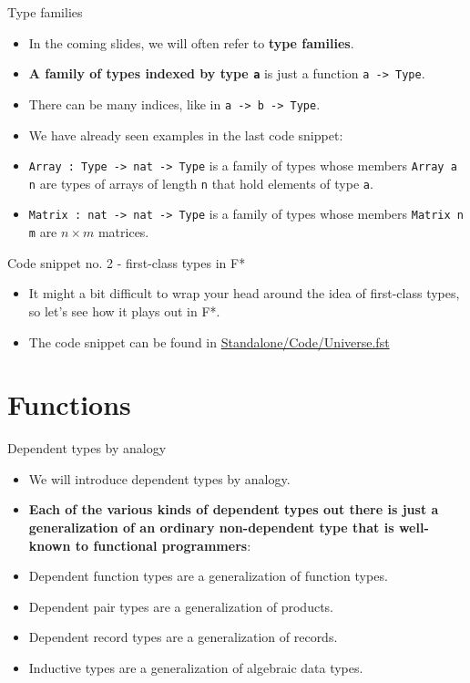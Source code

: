 \documentclass{beamer}
\newcommand{\m}[1]{\texttt{#1}}
\begin{document}
\begin{frame}{Type families}
\begin{itemize}
	\item In the coming slides, we will often refer to \textbf{type families}.
	\item \textbf{A family of types indexed by type \m{a}} is just a function \m{a -> Type}.
	\item There can be many indices, like in \m{a -> b -> Type}.
	\item We have already seen examples in the last code snippet:
	\item \m{Array :\ Type -> nat -> Type} is a family of types whose members \m{Array a n} are types of arrays of length \m{n} that hold elements of type \m{a}.
	\item \m{Matrix :\ nat -> nat -> Type} is a family of types whose members \m{Matrix n m} are $n \times m$ matrices.
\end{itemize}
\end{frame}

\begin{frame}{Code snippet no. 2 - first-class types in F*}
\begin{itemize}
	\item It might a bit difficult to wrap your head around the idea of first-class types, so let's see how it plays out in F*.
	\item The code snippet can be found in \href{https://github.com/wkolowski/Dependent-Types-and-Theorem-Proving/blob/master/Standalone/Code/Universe.fst}{Standalone/Code/Universe.fst}
\end{itemize}
\end{frame}

\section{Functions}

\begin{frame}{Dependent types by analogy}
\begin{itemize}
	\item We will introduce dependent types by analogy.
	\item \textbf{Each of the various kinds of dependent types out there is just a generalization of an ordinary non-dependent type that is well-known to functional programmers}:
	\item Dependent function types are a generalization of function types.
	\item Dependent pair types are a generalization of products.
	\item Dependent record types are a generalization of records.
	\item Inductive types are a generalization of algebraic data types.
\end{itemize}
\end{frame}
\end{document}
